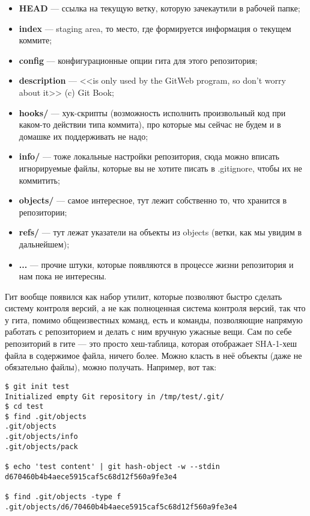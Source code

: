 \documentclass[a5paper]{article}
\begin{document}
\begin{itemize}
	\item \textbf{HEAD} --- ссылка на текущую ветку, которую зачекаутили в рабочей папке;
	\item \textbf{index} --- staging area, то место, где формируется информация о текущем коммите;
	\item \textbf{config} --- конфигурационные опции гита для этого репозитория;
	\item \textbf{description} --- <<is only used by the GitWeb program, so don’t worry about it>> (c) Git Book;
	\item \textbf{hooks/} --- хук-скрипты (возможность исполнить произвольный код при каком-то действии типа коммита), про которые мы сейчас не будем и в домашке их поддерживать не надо;
	\item \textbf{info/} --- тоже локальные настройки репозитория, сюда можно вписать игнорируемые файлы, которые вы не хотите писать в .gitignore, чтобы их не коммитить;
	\item \textbf{objects/} --- самое интересное, тут лежит собственно то, что хранится в репозитории;
	\item \textbf{refs/} --- тут лежат указатели на объекты из objects (ветки, как мы увидим в дальнейшем);
	\item \textbf{...} --- прочие штуки, которые появляются в процессе жизни репозитория и нам пока не интересны.
\end{itemize}

Гит вообще появился как набор утилит, которые позволяют быстро сделать систему контроля версий, а не как полноценная система контроля версий, так что у гита, помимо общеизвестных команд, есть и команды, позволяющие напрямую работать с репозиторием и делать с ним вручную ужасные вещи. Сам по себе репозиторий в гите --- это просто хеш-таблица, которая отображает SHA-1-хеш файла в содержимое файла, ничего более. Можно класть в неё объекты (даже не обязательно файлы), можно получать. Например, вот так:
\begin{verbatim}
$ git init test
Initialized empty Git repository in /tmp/test/.git/
$ cd test
$ find .git/objects
.git/objects
.git/objects/info
.git/objects/pack

$ echo 'test content' | git hash-object -w --stdin
d670460b4b4aece5915caf5c68d12f560a9fe3e4

$ find .git/objects -type f
.git/objects/d6/70460b4b4aece5915caf5c68d12f560a9fe3e4
\end{verbatim}
\end{document}
